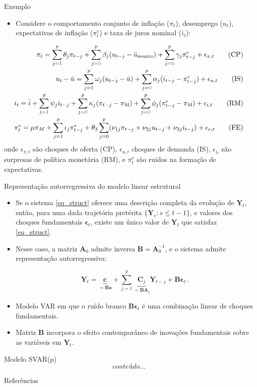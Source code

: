 \documentclass[11pt]{beamer}
\begin{document}
\begin{frame}{Exemplo}
	\begin{itemize}
			\item Considere o comportamento conjunto de inflação ($\pi_t$), desemprego ($u_t$), expectativas de inflação ($\pi^e_t$) e taxa de juros nominal ($i_t$):
	\end{itemize}
			\begin{align}
		\pi_t = \sum_{j={\color{blue}1}}^p \theta_j \pi_{t-j} + \sum_{j={\color{red}0}}^p \beta_j (u_{t-j}-\bar{u}_{\text{neutro}}) + \sum_{j={\color{red}0}}^p \gamma_j \pi_{t-j}^e + \epsilon_{\pi,t} \tag{CP} \\
		u_t - \bar{u} = \sum_{j={\color{blue}1}}^p \omega_j (u_{t-j}-\bar{u}) + \sum_{j={\color{red}0}}^p \alpha_j (i_{t-j} - \pi^e_{t-j})  + \epsilon_{u,t} \tag{IS} \\  i_t = \bar{i} + \sum_{j={\color{blue}1}}^p \psi_j i_{t-j} + \sum_{j={\color{red}0}}^p \kappa_j (\pi_{t-j}-\pi_{\text{M}}) + \sum_{j={\color{red}0}}^p \phi_j (\pi_{t-j}^e-\pi_{\text{M}}) + \epsilon_{i,t}\tag{RM}\\
		\pi^e_t = \mu \pi_{M} +  \sum_{j=1}^p \iota_j \pi^e_{t-j} + \theta_3 \sum_{j=0}^p (\nu_{1j} \pi_{t-j} + \nu_{2j} u_{t-j} + \nu_{3j} i_{t-j}) + \epsilon_{e,t} \tag{FE}
	\end{align}
	onde $\epsilon_{\pi,t}$ são choques de oferta (CP), $\epsilon_{u,t}$ choques de demanda (IS), $\epsilon_{i_t}$ são surpresas de política monetária (RM), e $\pi^e_t$ são ruídos na formação de expectativas.

\end{frame}

\begin{frame}{Representação autorregressiva do modelo linear estrutural}
	\begin{itemize}
		\item Se o sistema \eqref{eq_struct} oferece uma descrição {\color{blue}completa} da evolução de $\boldsymbol{Y}_t$, então, para uma dada trajetória pretérita $\{\boldsymbol{Y}_s: s \leq t-1\}$, e valores dos choques fundamentais $\boldsymbol{\epsilon}_t$, existe um único valor de $\boldsymbol{Y}_t$  que satisfaz \eqref{eq_struct}.
		\item Nesse caso, a matriz $\boldsymbol{A}_0$ admite inversa $\boldsymbol{B}= \boldsymbol{A}_0^{-1}$, e o sistema admite {\color{blue}representação autorregressiva}:
		
		$$\boldsymbol{Y}_t = \underbrace{\boldsymbol{c}}_{= \boldsymbol{B}\boldsymbol{a}} + \sum_{j=1}^p \underbrace{\boldsymbol{C}_j}_{=\boldsymbol{B} \boldsymbol{A}_j} \boldsymbol{Y}_{t-j}  + \boldsymbol{B}\boldsymbol{\epsilon}_t\, .$$
		
		\item Modelo VAR em que o ruído branco $\boldsymbol{B}\boldsymbol{\epsilon}_t$ é uma combinação linear de choques fundamentais.
		\item Matriz $\boldsymbol{B}$ incorpora o efeito contemporâneo de inovações fundamentais sobre as variáveis em $\boldsymbol{Y}_t$. 
	\end{itemize}
\end{frame}

\begin{frame}{Modelo SVAR(p)}
	\begin{equation}
		conteúdo...
	\end{equation}
\end{frame}
\appendix
\begin{frame}[allowframebreaks]{Referências}
	\printbibliography
\end{frame}
\end{document}
